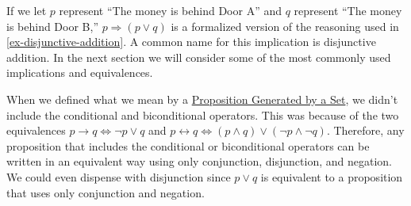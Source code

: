 \documentclass[10pt,]{book}
\theoremstyle{plain}
\theoremstyle{definition}
\theoremstyle{definition}
\theoremstyle{definition}
\theoremstyle{definition}
\begin{document}
\par
If we let \(p\) represent ``The money is behind Door A'' and \(q\) represent ``The money is behind Door B,'' \(p \Rightarrow (p \lor  q)\) is a formalized version of the reasoning used in \hyperref[ex-disjunctive-addition]{\ref{ex-disjunctive-addition}}. A common name for this implication is disjunctive addition. In the next section we will consider some of the most commonly used implications and equivalences.%
\par
When we defined what we mean by a \hyperref[def-proposition-generated-by-set]{Proposition Generated by a Set}, we didn't include the conditional and biconditional operators. This was because of the two equivalences \(p \to  q \Leftrightarrow  \neg p \lor  q\) and \(p \leftrightarrow  q \Leftrightarrow  (p \land  q) \lor  (\neg p \land  \neg q)\). Therefore, any proposition that includes the conditional or biconditional operators can be written in an equivalent way using only conjunction, disjunction, and negation. We could even dispense with disjunction since \(p \lor  q\) is equivalent to a proposition that uses only conjunction and negation.%
\typeout{************************************************}
\typeout{************************************************}
\end{document}

